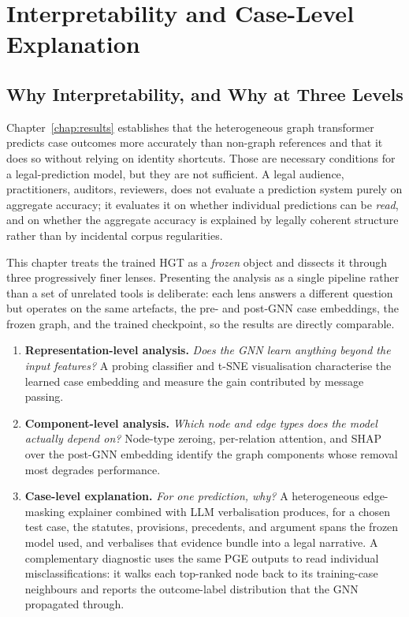 \chapter{Interpretability and Case-Level Explanation}
\label{chap:explainability}

\section{Why Interpretability, and Why at Three Levels}

Chapter~\ref{chap:results} establishes that the heterogeneous graph
transformer predicts case outcomes more accurately than non-graph
references and that it does so without relying on identity shortcuts.
Those are necessary conditions for a legal-prediction model, but they
are not sufficient. A legal audience, practitioners, auditors,
reviewers, does not evaluate a prediction system purely on aggregate
accuracy; it evaluates it on whether individual predictions can be
\emph{read}, and on whether the aggregate accuracy is explained by
legally coherent structure rather than by incidental corpus
regularities.

This chapter treats the trained HGT as a \emph{frozen} object and
dissects it through three progressively finer lenses. Presenting the
analysis as a single pipeline rather than a set of unrelated tools is
deliberate: each lens answers a different question but operates on the
same artefacts, the pre- and post-GNN case embeddings, the frozen
graph, and the trained checkpoint, so the results are directly
comparable.

\begin{enumerate}
  \item \textbf{Representation-level analysis.} \emph{Does the GNN
    learn anything beyond the input features?} A probing classifier
    and t-SNE visualisation characterise the learned case embedding
    and measure the gain contributed by message passing.
  \item \textbf{Component-level analysis.} \emph{Which node and edge
    types does the model actually depend on?} Node-type zeroing,
    per-relation attention, and SHAP over the post-GNN embedding
    identify the graph components whose removal most degrades
    performance.
  \item \textbf{Case-level explanation.} \emph{For one prediction,
    \emph{why}?} A heterogeneous edge-masking explainer combined
    with LLM verbalisation produces, for a chosen test case, the
    statutes, provisions, precedents, and argument spans the frozen
    model used, and verbalises that evidence bundle into a legal
    narrative. A complementary diagnostic uses the same PGE outputs
    to read individual misclassifications: it walks each top-ranked
    node back to its training-case neighbours and reports the
    outcome-label distribution that the GNN propagated through.
\end{enumerate}

